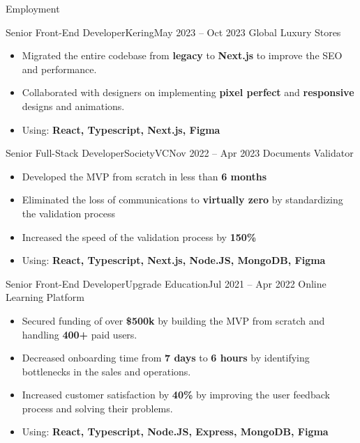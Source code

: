 \documentclass[]{mcdowellcv}
\begin{document}
	\makeheader
	
	\begin{cvsection}{Employment}
		\begin{cvsubsection}{Senior Front-End Developer}{Kering}{May 2023 -- Oct 2023}
			Global Luxury Stores
			\begin{itemize}
				\item Migrated the entire codebase from \textbf{legacy} to \textbf{Next.js} to improve the SEO and performance.
				\item Collaborated with designers on implementing \textbf{pixel perfect} and \textbf{responsive} designs and animations.
				\item Using: \textbf{React, Typescript, Next.js, Figma}
			\end{itemize}
		\end{cvsubsection}

		\begin{cvsubsection}{Senior Full-Stack Developer}{SocietyVC}{Nov 2022 -- Apr 2023}
			Documents Validator
			\begin{itemize}
				\item Developed the MVP from scratch in less than \textbf{6 months}
				\item Eliminated the loss of communications to \textbf{virtually zero} by standardizing the validation process
				\item Increased the speed of the validation process by \textbf{150\%}
				\item Using: \textbf{React, Typescript, Next.js, Node.JS, MongoDB, Figma}
			\end{itemize}
		\end{cvsubsection}

		\begin{cvsubsection}{Senior Front-End Developer}{Upgrade Education}{Jul 2021 -- Apr 2022}
			Online Learning Platform
			\begin{itemize}
				\item Secured funding of over \textbf{\$500k} by building the MVP from scratch and handling \textbf{400+} paid users.
				\item Decreased onboarding time from \textbf{7 days} to \textbf{6 hours} by identifying bottlenecks in the sales and operations.
				\item Increased customer satisfaction by \textbf{40\%} by improving the user feedback process and solving their problems.
				\item Using: \textbf{React, Typescript, Node.JS, Express, MongoDB, Figma}
			\end{itemize}
		\end{cvsubsection}


\end{cvsection}
\end{document}
